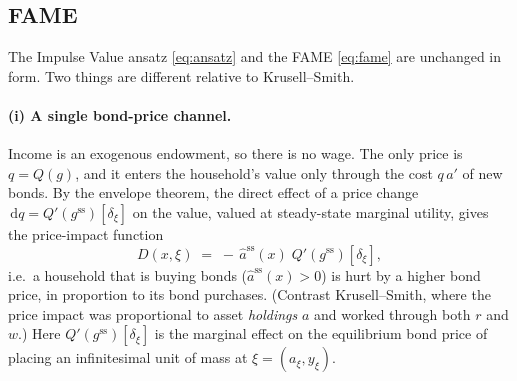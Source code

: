 \documentclass[11pt]{article}
\newcommand{\gss}{g^{\mathrm{ss}}}
\newcommand{\dd}{\,\mathrm{d}}
\begin{document}
\subsection{FAME}

The Impulse Value ansatz \eqref{eq:ansatz} and the FAME \eqref{eq:fame} are unchanged
in form. Two things are different relative to Krusell--Smith.

\paragraph{(i) A single bond-price channel.} Income is an exogenous endowment, so there
is no wage. The only price is $q=Q(g)$, and it enters the household's value only
through the cost $q\,a'$ of new bonds. By the envelope theorem, the direct effect of a
price change $\dd q=Q'(\gss)[\delta_\xi]$ on the value, valued at steady-state marginal
utility, gives the price-impact function
\begin{equation}\label{eq:hug-D}
  D(x,\xi) \;=\; -\,\hat a^{\mathrm{ss}}(x)\;Q'(\gss)[\delta_\xi],
\end{equation}
i.e.\ a household that is buying bonds ($\hat a^{\mathrm{ss}}(x)>0$) is hurt by a higher
bond price, in proportion to its bond purchases. (Contrast Krusell--Smith, where the
price impact was proportional to asset \emph{holdings} $a$ and worked through both $r$
and $w$.) Here $Q'(\gss)[\delta_\xi]$ is the marginal effect on the equilibrium bond
price of placing an infinitesimal unit of mass at $\xi=(a_\xi,y_\xi)$.
\end{document}

